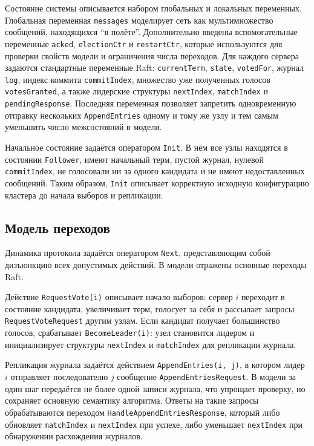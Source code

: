 Состояние системы описывается набором глобальных и локальных переменных.
Глобальная переменная \texttt{messages} моделирует сеть как мультимножество
сообщений, находящихся ``в полёте''. Дополнительно введены вспомогательные
переменные \texttt{acked}, \texttt{electionCtr} и \texttt{restartCtr}, которые
используются для проверки свойств модели и ограничения числа переходов. Для
каждого сервера задаются стандартные переменные Raft:
\texttt{currentTerm}, \texttt{state}, \texttt{votedFor}, журнал
\texttt{log}, индекс коммита \texttt{commitIndex}, множество уже полученных
голосов \texttt{votesGranted}, а также лидерские структуры \texttt{nextIndex},
\texttt{matchIndex} и \texttt{pendingResponse}. Последняя переменная позволяет
запретить одновременную отправку нескольких \texttt{AppendEntries} одному и тому
же узлу и тем самым уменьшить число межсостояний в модели.

Начальное состояние задаётся оператором \texttt{Init}. В нём все узлы находятся
в состоянии \texttt{Follower}, имеют начальный терм, пустой журнал, нулевой
\texttt{commitIndex}, не голосовали ни за одного кандидата и не имеют
недоставленных сообщений. Таким образом, \texttt{Init} описывает корректную
исходную конфигурацию кластера до начала выборов и репликации.

\subsection{Модель переходов}

Динамика протокола задаётся оператором \texttt{Next}, представляющим собой
дизъюнкцию всех допустимых действий. В модели отражены основные переходы Raft.

Действие \texttt{RequestVote(i)} описывает начало выборов: сервер $i$
переходит в состояние кандидата, увеличивает терм, голосует за себя и рассылает
запросы \texttt{RequestVoteRequest} другим узлам. Если кандидат получает
большинство голосов, срабатывает \texttt{BecomeLeader(i)}: узел становится
лидером и инициализирует структуры \texttt{nextIndex} и \texttt{matchIndex} для
репликации журнала.

Репликация журнала задаётся действием \texttt{AppendEntries(i, j)}, в котором
лидер $i$ отправляет последователю $j$ сообщение \texttt{AppendEntriesRequest}.
В модели за один шаг передаётся не более одной записи журнала, что упрощает
проверку, но сохраняет основную семантику алгоритма. Ответы на такие запросы
обрабатываются переходом \texttt{HandleAppendEntriesResponse}, который либо
обновляет \texttt{matchIndex} и \texttt{nextIndex} при успехе, либо уменьшает
\texttt{nextIndex} при обнаружении расхождения журналов.

